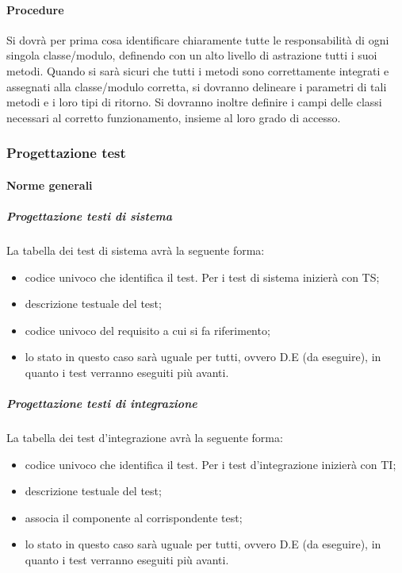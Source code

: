 \paragraph{Procedure}
Si dovrà per prima cosa identificare chiaramente tutte le responsabilità di ogni singola classe/modulo, definendo con un alto livello di astrazione tutti i suoi metodi.
Quando si sarà sicuri che tutti i metodi sono correttamente integrati e assegnati alla classe/modulo corretta, si dovranno delineare i parametri di tali metodi e i loro tipi di ritorno.
Si dovranno inoltre definire i campi delle classi necessari al corretto funzionamento, insieme al loro grado di accesso.

\subsubsection{Progettazione test}
\label{prog_test}
\paragraph{Norme generali}
\subparagraph{Progettazione testi di sistema}
La tabella dei test di sistema avrà la seguente forma:
\begin{itemize}
\item {}codice univoco che identifica il test. Per i test di sistema inizierà con TS;
\item {} descrizione testuale del test;
\item {}codice univoco del requisito a cui si fa riferimento;
\item {}lo stato in questo caso sarà uguale per tutti, ovvero D.E (da eseguire), in quanto i test verranno eseguiti più avanti.
\end{itemize}


\subparagraph{Progettazione testi di integrazione}
La tabella dei test d'integrazione avrà la seguente forma:
\begin{itemize}
\item {}codice univoco che identifica il test. Per i test d'integrazione inizierà con TI;
\item {} descrizione testuale del test;
\item {} associa il componente al corrispondente test;
\item {}lo stato in questo caso sarà uguale per tutti, ovvero D.E (da eseguire), in quanto i test verranno eseguiti più avanti.
\end{itemize}

